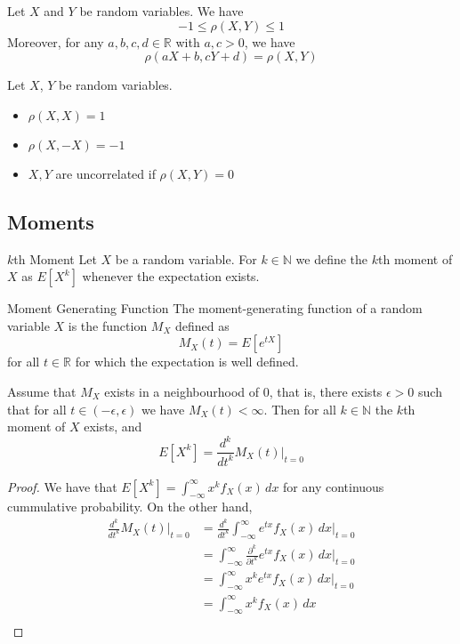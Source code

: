\documentclass[a4paper]{article}
\begin{document}
\begin{prp}{}{} Let $X$ and $Y$ be random variables. We have $$-1\leq\rho(X,Y)\leq 1$$ Moreover, for any $a,b,c,d\in\mathbb{R}$ with $a,c>0$, we have $$\rho(aX+b,cY+d)=\rho(X,Y)$$
\end{prp}

\begin{prp}{}{} Let $X$, $Y$ be random variables. 
\begin{itemize}
\item $\rho(X,X)=1$
\item $\rho(X,-X)=-1$
\item $X,Y$ are uncorrelated if $\rho(X,Y)=0$
\end{itemize}
\end{prp}

\subsection{Moments}
\begin{defn}{$k$th Moment}{} Let $X$ be a random variable. For $k\in\mathbb{N}$ we define the $k$th  moment of $X$ as $E[X^k]$ whenever the expectation exists. 
\end{defn}

\begin{defn}{Moment Generating Function}{} The moment-generating function of a random variable $X$ is the function $M_X$ defined as $$M_X(t)=E[e^{tX}]$$ for all $t\in\mathbb{R}$ for which the expectation is well defined. 
\end{defn}

\begin{thm}{}{} Assume that $M_X$ exists in a neighbourhood of $0$, that is, there exists $\epsilon>0$ such that for all $t\in(-\epsilon,\epsilon)$ we have $M_X(t)<\infty$. Then for all $k\in\mathbb{N}$ the $k$th moment of $X$ exists, and $$E[X^k]=\frac{d^k}{dt^k}M_X(t)\bigg|_{t=0}$$
\end{thm}
\begin{proof} We have that $E[X^k]=\int_{-\infty}^\infty x^kf_X(x)\,dx$ for any continuous cummulative probability. On the other hand, 
\begin{align*}
\frac{d^k}{dt^k}M_X(t)\bigg|_{t=0}&=\frac{d^k}{dt^k}\int_{-\infty}^\infty e^{tx}f_X(x)\,dx\bigg|_{t=0}\\
&=\int_{-\infty}^\infty\frac{\partial^k}{\partial t^k}e^{tx}f_X(x)\,dx\bigg|_{t=0}\\
&=\int_{-\infty}^\infty x^ke^{tx}f_X(x)\,dx\bigg|_{t=0}\\
&=\int_{-\infty}^\infty x^kf_X(x)\,dx\\
\end{align*}
\end{proof}
\end{document}
